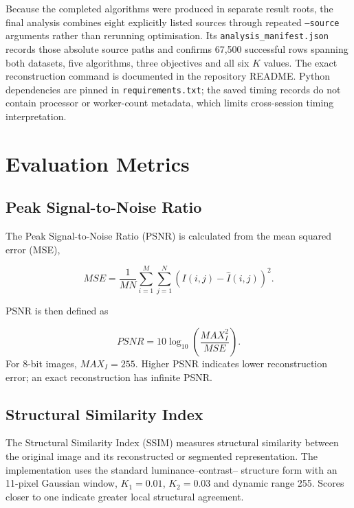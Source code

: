 \documentclass[review,authoryear]{elsarticle}
\begin{document}
Because the completed algorithms were produced in separate result roots, the
final analysis combines eight explicitly listed sources through repeated
\texttt{--source} arguments rather than rerunning optimisation. Its
\texttt{analysis\_manifest.json} records those absolute source paths and
confirms 67,500 successful rows spanning both datasets, five algorithms,
three objectives and all six $K$ values. The exact reconstruction command is
documented in the repository README. Python dependencies are pinned in
\texttt{requirements.txt}; the saved timing records do not contain processor
or worker-count metadata, which limits cross-session timing interpretation.





\section{Evaluation Metrics}
\label{sec:metrics}


\subsection{Peak Signal-to-Noise Ratio}

The Peak Signal-to-Noise Ratio (PSNR) is calculated from the mean
squared error (MSE),

\begin{equation}
MSE =
\frac{1}{MN}
\sum_{i=1}^{M}
\sum_{j=1}^{N}
\left(
I(i,j)-\hat{I}(i,j)
\right)^2.
\end{equation}

PSNR is then defined as

\begin{equation}
PSNR =
10\log_{10}
\left(
\frac{MAX_I^2}{MSE}
\right).
\end{equation}
For 8-bit images, $MAX_I=255$. Higher PSNR indicates lower reconstruction
error; an exact reconstruction has infinite PSNR.


\subsection{Structural Similarity Index}

The Structural Similarity Index (SSIM) measures structural similarity
between the original image and its reconstructed or segmented
representation. The implementation uses the standard luminance--contrast--
structure form with an 11-pixel Gaussian window, $K_1=0.01$, $K_2=0.03$ and
dynamic range 255. Scores closer to one indicate greater local structural
agreement.
\end{document}
